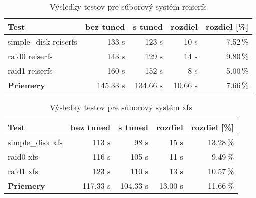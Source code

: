 \begin{table}[H]
\begin{center}
\begin{tabular}{|l|r|r|r|r|}
    \hline
    \textbf{Test} & \textbf{bez tuned} & \textbf{s tuned} & \textbf{rozdiel} & \textbf{rozdiel [\%]} \\ \hline
    simple\_disk reiserfs & 133 s & 123 s & 10 s & 7.52\,\% \\
    \hline
    raid0 reiserfs & 143 s & 129 s & 14 s & 9.80\,\% \\
    \hline
    raid1 reiserfs & 160 s & 152 s & 8 s & 5.00\,\% \\
    \hline
    \textbf{Priemery} & 145.33 s & 134.66 s & 10.66 s & 7.66\,\% \\
    \hline
\end{tabular}
\caption{Výsledky testov pre súborový systém reiserfs}
\label{tab:results-reiserfs}
\end{center}
\end{table}

\begin{table}[H]
\begin{center}
\begin{tabular}{|l|r|r|r|r|}
    \hline
    \textbf{Test} & \textbf{bez tuned} & \textbf{s tuned} & \textbf{rozdiel} & \textbf{rozdiel [\%]} \\ \hline
    simple\_disk xfs & 113 s & 98 s & 15 s & 13.28\,\% \\
    \hline
    raid0 xfs & 116 s & 105 s & 11 s & 9.49\,\% \\
    \hline
    raid1 xfs & 123 s & 110 s & 13 s & 10.57\,\% \\
    \hline
    \textbf{Priemery} & 117.33 s & 104.33 s & 13.00 s & 11.66\,\% \\
    \hline
\end{tabular}
\caption{Výsledky testov pre súborový systém xfs}
\label{tab:results-xfs}
\end{center}
\end{table}

%
%

